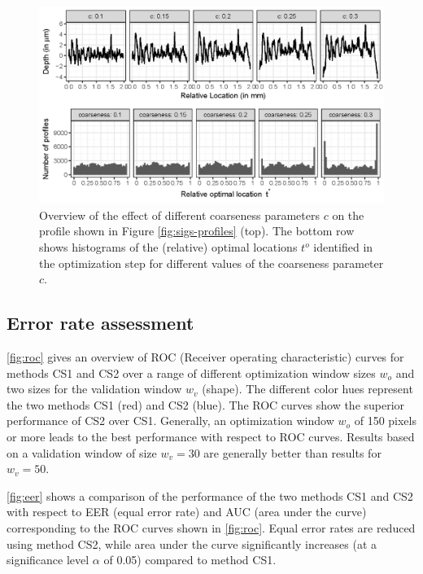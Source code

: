 \documentclass[12pt]{article}
\begin{document}
\begin{figure}

{\centering \includegraphics[width=\textwidth]{figures/profile-sketch-1} 

}

\caption{Overview of the effect of different coarseness parameters $c$ on the profile shown in Figure \ref{fig:sigs-profiles} (top). The bottom row shows histograms of  the (relative) optimal locations $t^o$ identified in the optimization step for different values of the coarseness parameter $c$. }\label{fig:profile-sketch}
\end{figure}

\subsection{Error rate assessment}\label{error-rate-assessment}

\autoref{fig:roc} gives an overview of ROC (Receiver operating
characteristic) curves for methods CS1 and CS2 over a range of different
optimization window sizes \(w_o\) and two sizes for the validation
window \(w_v\) (shape). The different color hues represent the two
methods CS1 (red) and CS2 (blue). The ROC curves show the superior
performance of CS2 over CS1. Generally, an optimization window \(w_o\)
of 150 pixels or more leads to the best performance with respect to ROC
curves. Results based on a validation window of size \(w_v = 30\) are
generally better than results for \(w_v = 50\).

\autoref{fig:eer} shows a comparison of the performance of the two
methods CS1 and CS2 with respect to EER (equal error rate) and AUC (area
under the curve) corresponding to the ROC curves shown in
\autoref{fig:roc}. Equal error rates are reduced using method CS2, while
area under the curve significantly increases (at a significance level
\(\alpha\) of 0.05) compared to method CS1.
\end{document}

